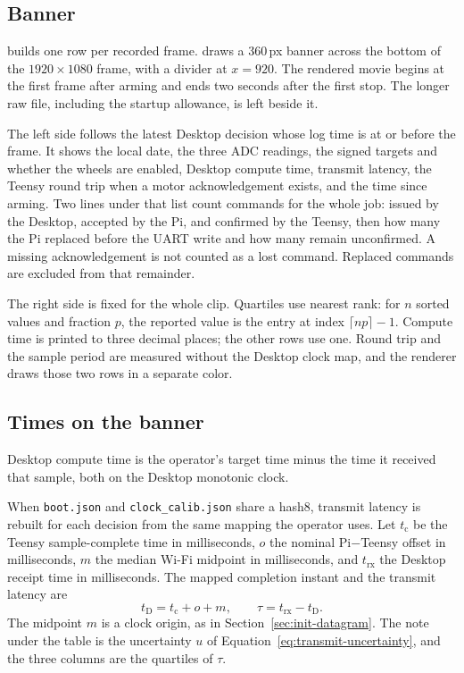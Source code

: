 \subsection{Banner}
 builds one row per recorded frame.  draws a 360\,px banner across the bottom of the \(1920\times1080\) frame, with a divider at \(x=920\). The rendered movie begins at the first frame after arming and ends two seconds after the first stop. The longer raw file, including the startup allowance, is left beside it.

The left side follows the latest Desktop decision whose log time is at or before the frame. It shows the local date, the three ADC readings, the signed targets and whether the wheels are enabled, Desktop compute time, transmit latency, the Teensy round trip when a motor acknowledgement exists, and the time since arming. Two lines under that list count commands for the whole job: issued by the Desktop, accepted by the Pi, and confirmed by the Teensy, then how many the Pi replaced before the UART write and how many remain unconfirmed. A missing acknowledgement is not counted as a lost command. Replaced commands are excluded from that remainder.

The right side is fixed for the whole clip. Quartiles use nearest rank: for \(n\) sorted values and fraction \(p\), the reported value is the entry at index \(\lceil np\rceil-1\). Compute time is printed to three decimal places; the other rows use one. Round trip and the sample period are measured without the Desktop clock map, and the renderer draws those two rows in a separate color.

\subsection{Times on the banner}
Desktop compute time is the operator's target time minus the time it received that sample, both on the Desktop monotonic clock.

When \texttt{boot.json} and \texttt{clock\_calib.json} share a hash8, transmit latency is rebuilt for each decision from the same mapping the operator uses. Let \(t_{\mathrm{c}}\) be the Teensy sample-complete time in milliseconds, \(o\) the nominal Pi$-$Teensy offset in milliseconds, \(m\) the median Wi-Fi midpoint in milliseconds, and \(t_{\mathrm{rx}}\) the Desktop receipt time in milliseconds. The mapped completion instant and the transmit latency are
\begin{equation}
t_{\mathrm{D}}=t_{\mathrm{c}}+o+m,
\qquad
\tau=t_{\mathrm{rx}}-t_{\mathrm{D}}.
\label{eq:video-transmit}
\end{equation}
The midpoint \(m\) is a clock origin, as in Section~\ref{sec:init-datagram}. The note under the table is the uncertainty \(u\) of Equation~\eqref{eq:transmit-uncertainty}, and the three columns are the quartiles of \(\tau\).

